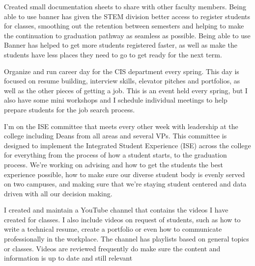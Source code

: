 {
{Created small documentation sheets to share with other faculty members.  Being able to use banner has given the STEM division better access to register students for classes, smoothing out the retention between semesters and helping to make the continuation to graduation pathway as seamless as possible.  Being able to use Banner has helped to get more students registered faster, as well as make the students have less places they need to go to get ready for the next term.}

{Organize and run career day for the CIS department every spring.  This day is focused on resume building, interview skills, elevator pitches and portfolios, as well as the other pieces of getting a job.  This is an event held every spring, but I also have some mini workshops and I schedule individual meetings to help prepare students for the job search process.}

{I'm on the ISE committee that meets every other week with leadership at the college including Deans from all areas and several VPs.  This committee is designed to implement the Integrated Student Experience (ISE) across the college for everything from the process of how a student starts, to the graduation process.  We’re working on advising and how to get the students the best experience possible, how to make sure our diverse student body is evenly served on two campuses, and making sure that we’re staying student centered and data driven with all our decision making.}


{I created and maintain a YouTube channel that contains the videos I have created for classes.  I also include videos on request of students, such as how to write a technical resume, create a portfolio or even how to communicate professionally in the workplace.  The channel has playlists based on general topics or classes.  Videos are reviewed frequently do make sure the content and information is up to date and still relevant}


}
